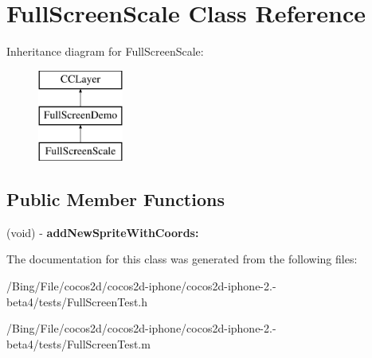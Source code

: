\hypertarget{interface_full_screen_scale}{\section{Full\-Screen\-Scale Class Reference}
\label{interface_full_screen_scale}
}
Inheritance diagram for Full\-Screen\-Scale\-:\begin{figure}[H]
\begin{center}
\leavevmode
\includegraphics[height=3.000000cm]{interface_full_screen_scale}
\end{center}
\end{figure}
\subsection*{Public Member Functions}
\begin{DoxyCompactItemize}
\item 
\hypertarget{interface_full_screen_scale_ac0efac25746bc1f6f693b0629c8e0a5c}{(void) -\/ {\bfseries add\-New\-Sprite\-With\-Coords\-:}}\label{interface_full_screen_scale_ac0efac25746bc1f6f693b0629c8e0a5c}

\end{DoxyCompactItemize}


The documentation for this class was generated from the following files\-:\begin{DoxyCompactItemize}
\item 
/\-Bing/\-File/cocos2d/cocos2d-\/iphone/cocos2d-\/iphone-\/2.-\/beta4/tests/Full\-Screen\-Test.\-h\item 
/\-Bing/\-File/cocos2d/cocos2d-\/iphone/cocos2d-\/iphone-\/2.-\/beta4/tests/Full\-Screen\-Test.\-m\end{DoxyCompactItemize}
